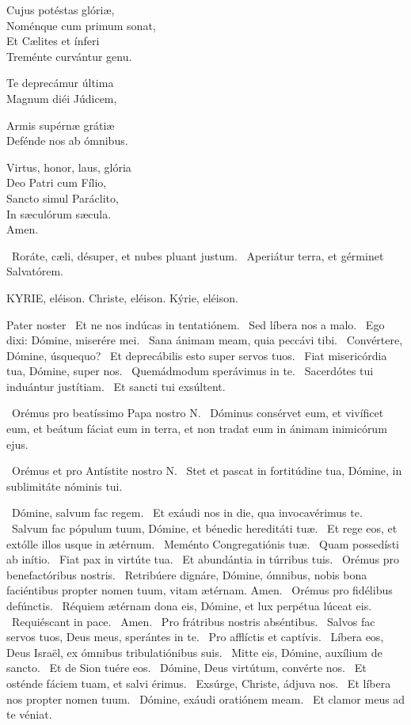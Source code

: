 Cujus potéstas glóriæ,\\
Noménque cum primum sonat,\\
Et Cælites et ínferi\\
Treménte curvántur genu.

Te deprecámur última\\
Magnum diéi Júdicem,

Armis supérnæ grátiæ\\
Defénde nos ab ómnibus.

Virtus, honor, laus, glória\\
Deo Patri cum Fílio,\\
Sancto simul Paráclito,\\
In sæculórum sæcula.\\
Amen.

\V\ Roráte, cæli, désuper, et nubes pluant justum. \R\ Aperiátur terra, et gérminet Salvatórem.



\label{feria5:precesferialesvesperas}

KYRIE, eléison. Christe, eléison. Kýrie, eléison.

Pater noster  \V\ Et ne nos indúcas in tentatiónem. \R\ Sed líbera nos a malo. \V\ Ego dixi: Dómine, miserére mei. \R\ Sana ánimam meam, quia peccávi tibi. \V\ Convértere, Dómine, úsquequo? \R\ Et deprecábilis esto super servos tuos. \V\ Fiat misericórdia tua, Dómine, super nos. \R\ Quemádmodum sperávimus in te. \V\ Sacerdótes tui induántur justítiam. \R\ Et sancti tui exsúltent.

\V\ Orémus pro beatíssimo Papa nostro N. \R\ Dóminus consérvet eum, et vivíficet eum, et beátum fáciat eum in terra, et non tradat eum in ánimam inimicórum ejus.

\V\ Orémus et pro Antístite nostro N. \R\ Stet et pascat in fortitúdine tua, Dómine, in sublimitáte nóminis tui.

\V\ Dómine, salvum fac regem. \R\ Et exáudi nos in die, qua invocavérimus te. \V\ Salvum fac pópulum tuum, Dómine, et bénedic hereditáti tuæ. \R\ Et rege eos, et extólle illos usque in ætérnum. \V\ Meménto Congregatiónis tuæ. \R\ Quam possedísti ab inítio. \V\ Fiat pax in virtúte tua. \R\ Et abundántia in túrribus tuis. \V\ Orémus pro benefactóribus nostris. \R\ Retribúere dignáre, Dómine, ómnibus, nobis bona faciéntibus propter nomen tuum, vitam ætérnam. Amen. \V\ Orémus pro fidélibus defúnctis. \R\ Réquiem ætérnam dona eis, Dómine, et lux perpétua lúceat eis. \V\ Requiéscant in pace. \R\ Amen. \V\ Pro frátribus nostris abséntibus. \R\ Salvos fac servos tuos, Deus meus, sperántes in te. \V\ Pro afflíctis et captívis. \R\ Líbera eos, Deus Israël, ex ómnibus tribulatiónibus suis. \V\ Mitte eis, Dómine, auxílium de sancto. \R\ Et de Sion tuére eos. \V\ Dómine, Deus virtútum, convérte nos. \R\ Et osténde fáciem tuam, et salvi érimus. \V\ Exsúrge, Christe, ádjuva nos. \R\ Et líbera nos propter nomen tuum. \V\ Dómine, exáudi oratiónem meam. \R\ Et clamor meus ad te véniat.

